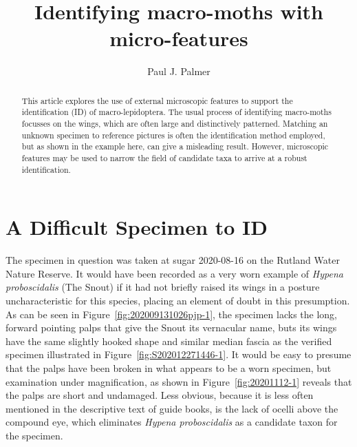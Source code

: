 \documentclass[]{article}
\title{Identifying macro-moths with micro-features}
\author{Paul J. Palmer}
\begin{document}
\maketitle

\begin{abstract}

This article explores the use of external microscopic features to support the identification (ID) of  macro-lepidoptera. The usual process of identifying macro-moths  focusses on the wings, which are often large and distinctively patterned. Matching an unknown specimen to reference pictures is often the identification method employed, but as shown in the example here, can give a misleading result.
 However, microscopic features may be used to narrow the field of candidate taxa to arrive at a robust identification. 

\end{abstract}

\section*{A Difficult Specimen to ID}
The specimen in question was taken at sugar 2020-08-16 on the Rutland Water Nature Reserve. It would have been recorded as a very worn example of \textit{Hypena proboscidalis} (The Snout) if it had not briefly raised its wings in a posture uncharacteristic for this species, placing an element of doubt in this presumption. As can be seen in Figure~\ref{fig:202009131026pjp-1}, the specimen lacks the long, forward pointing palps that give the Snout its vernacular name, buts its wings have the same slightly hooked shape  and similar median fascia as the verified specimen illustrated in  Figure~\ref{fig:S202012271446-1}.  It would be easy to presume that the palps have been broken in what appears to be a worn specimen, but examination under magnification, as shown in  Figure~\ref{fig:20201112-1} reveals that the palps are short and undamaged. Less obvious, because it is less often mentioned in the descriptive text of guide books, is the lack of ocelli above the compound eye,  which  eliminates \textit{Hypena proboscidalis} as a candidate taxon for the specimen.
\end{document}
